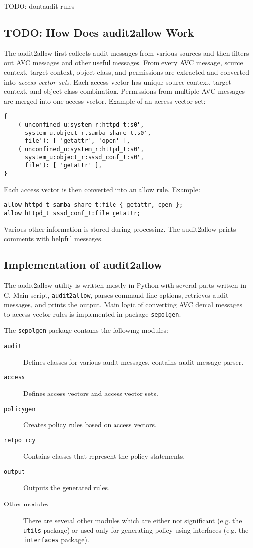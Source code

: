 TODO: dontaudit rules

\subsection{TODO: How Does audit2allow Work}
The audit2allow first collects audit messages from various sources and then
filters out AVC messages and other useful messages. From every AVC message,
source context, target context, object class, and permissions are extracted and
converted into \emph{access vector sets}. Each access vector has unique source
context, target context, and object class combination. Permissions from multiple
AVC messages are merged into one access vector. Example of an access vector set:
\begin{lstlisting}
{
    ('unconfined_u:system_r:httpd_t:s0',
     'system_u:object_r:samba_share_t:s0',
     'file'): [ 'getattr', 'open' ],
    ('unconfined_u:system_r:httpd_t:s0',
     'system_u:object_r:sssd_conf_t:s0',
     'file'): [ 'getattr' ],
}
\end{lstlisting}

Each access vector is then converted into an allow rule. Example:
\begin{lstlisting}
allow httpd_t samba_share_t:file { getattr, open };
allow httpd_t sssd_conf_t:file getattr;
\end{lstlisting}

Various other information is stored during processing. The audit2allow prints
comments with helpful messages.

\subsection{Implementation of audit2allow}
The audit2allow utility is written mostly in Python with several parts written
in C. Main script, \texttt{audit2allow}, parses command-line options, retrieves
audit messages, and prints the output.  Main logic of converting AVC denial
messages to access vector rules is implemented in package \texttt{sepolgen}.

The \texttt{sepolgen} package contains the following modules:
\begin{description}
    \item [\texttt{audit}] Defines classes for various audit messages, contains
        audit message parser.
    \item [\texttt{access}] Defines access vectors and access vector sets.
    \item [\texttt{policygen}] Creates policy rules based on access vectors.
    \item [\texttt{refpolicy}] Contains classes that represent the policy
        statements.
    \item [\texttt{output}] Outputs the generated rules.
    \item [Other modules] There are several other modules which are either not
        significant (e.g. the \texttt{utils} package) or used only for
        generating policy using interfaces (e.g. the \texttt{interfaces}
        package).
\end{description}


